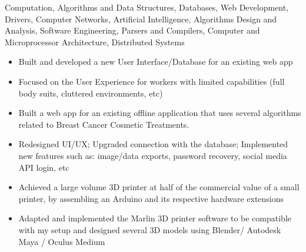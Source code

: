 \documentclass[10pt,a4paper]{altacv}
\begin{document}

\begin{fullwidth}
\makecvheader
\end{fullwidth}

\begin{itemize}
    \itemGraphical Computation, Algorithms and Data Structures, Databases, Web Development, Drivers, Computer Networks, Artificial Intelligence, Algorithms Design and Analysis, Software Engineering, Parsers and Compilers, Computer and Microprocessor Architecture, Distributed Systems
\end{itemize}


\begin{itemize}
\item Built and developed a new User Interface/Database for an existing web app
\item Focused on the User Experience for workers with limited capabilities (full body suits, cluttered environments, etc)
\end{itemize}

\vspace{2mm}

\begin{itemize}
\item Built a web app for an existing offline application that uses several algorithms related to Breast Cancer Cosmetic Treatments.
\item Redesigned UI/UX; Upgraded connection with the database; Implemented new features such as: image/data exports, password recovery, social media API login, etc

\end{itemize}


\begin{itemize}
    \item Achieved a large volume 3D printer at half of the commercial value of a small printer, by assembling an Arduino and its respective hardware extensions
    \item Adapted and implemented the Marlin 3D printer software to be compatible with my setup and designed several 3D models using Blender/ Autodesk Maya / Oculus Medium
\end{itemize}
\end{document}
